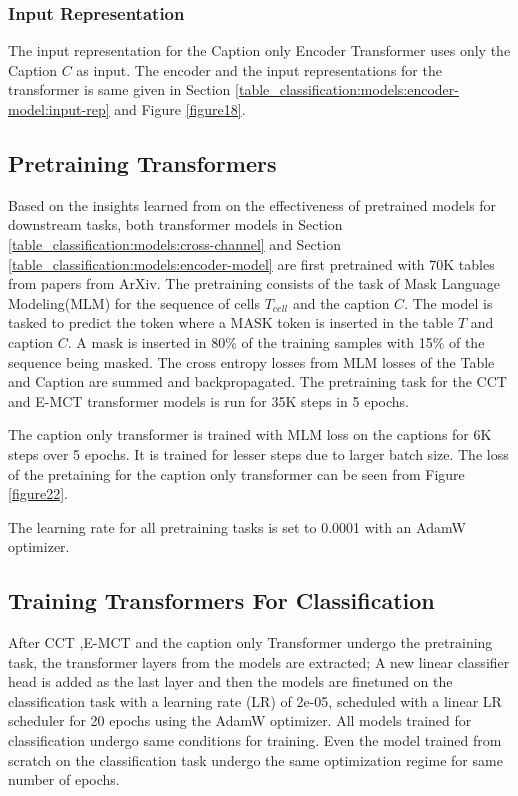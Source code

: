 \subsubsection{Input Representation}
The input representation for the Caption only Encoder Transformer uses only the Caption $C$ as input. The encoder and the input representations for the transformer is same given in Section \ref{table_classification:models:encoder-model:input-rep} and Figure \ref{figure18}.

\subsection{Pretraining Transformers}
\label{table_classification:pre-train}
Based on the insights learned from \cite{hernandez2021scaling} on the effectiveness of pretrained models for downstream tasks, both transformer models in Section \ref{table_classification:models:cross-channel} and Section \ref{table_classification:models:encoder-model} are first pretrained with 70K tables from papers from ArXiv. The pretraining consists of the task of Mask Language Modeling(MLM) for the sequence of cells $T_{cell}$ and the caption $C$. The model is tasked to predict the token where a MASK token is inserted in the table $T$ and caption $C$. A mask is inserted in 80\% of the training samples with 15\% of the sequence being masked. The cross entropy losses from MLM losses of the Table and Caption are summed and backpropagated. The pretraining task for the CCT and E-MCT transformer models is run for 35K steps in 5 epochs.

The caption only transformer is trained with MLM loss on the captions for 6K steps over 5 epochs. It is trained for lesser steps due to larger batch size. The loss of the pretaining for the caption only transformer can be seen from Figure \ref{figure22}. 

The learning rate for all pretraining tasks is set to 0.0001 with an AdamW \parencite{loshchilov2017decoupled} optimizer. 

\subsection{Training Transformers For Classification}
\label{table_classification:models:class-task}
After CCT ,E-MCT and the caption only Transformer undergo the pretraining task, the transformer layers from the models are extracted; A new linear classifier head is added as the last layer and then the models are finetuned on the classification task with a learning rate (LR) of 2e-05, scheduled with a linear LR scheduler for 20 epochs using the AdamW optimizer. All models trained for classification undergo same conditions for training. Even the model trained from scratch on the classification task undergo the same optimization regime for same number of epochs.  

